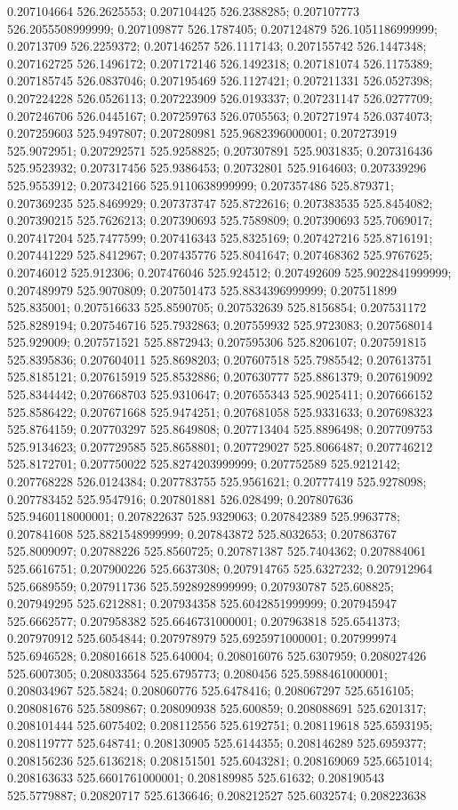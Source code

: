 0.207104664 526.2625553; 0.207104425 526.2388285; 0.207107773 526.2055508999999; 0.207109877 526.1787405; 0.207124879 526.1051186999999; 0.20713709 526.2259372; 0.207146257 526.1117143; 0.207155742 526.1447348; 0.207162725 526.1496172; 0.207172146 526.1492318; 0.207181074 526.1175389; 0.207185745 526.0837046; 0.207195469 526.1127421; 0.207211331 526.0527398; 0.207224228 526.0526113; 0.207223909 526.0193337; 0.207231147 526.0277709; 0.207246706 526.0445167; 0.207259763 526.0705563; 0.207271974 526.0374073; 0.207259603 525.9497807; 0.207280981 525.9682396000001; 0.207273919 525.9072951; 0.207292571 525.9258825; 0.207307891 525.9031835; 0.207316436 525.9523932; 0.207317456 525.9386453; 0.20732801 525.9164603; 0.207339296 525.9553912; 0.207342166 525.9110638999999; 0.207357486 525.879371; 0.207369235 525.8469929; 0.207373747 525.8722616; 0.207383535 525.8454082; 0.207390215 525.7626213; 0.207390693 525.7589809; 0.207390693 525.7069017; 0.207417204 525.7477599; 0.207416343 525.8325169; 0.207427216 525.8716191; 0.207441229 525.8412967; 0.207435776 525.8041647; 0.207468362 525.9767625; 0.20746012 525.912306; 0.207476046 525.924512; 0.207492609 525.9022841999999; 0.207489979 525.9070809; 0.207501473 525.8834396999999; 0.207511899 525.835001; 0.207516633 525.8590705; 0.207532639 525.8156854; 0.207531172 525.8289194; 0.207546716 525.7932863; 0.207559932 525.9723083; 0.207568014 525.929009; 0.207571521 525.8872943; 0.207595306 525.8206107; 0.207591815 525.8395836; 0.207604011 525.8698203; 0.207607518 525.7985542; 0.207613751 525.8185121; 0.207615919 525.8532886; 0.207630777 525.8861379; 0.207619092 525.8344442; 0.207668703 525.9310647; 0.207655343 525.9025411; 0.207666152 525.8586422; 0.207671668 525.9474251; 0.207681058 525.9331633; 0.207698323 525.8764159; 0.207703297 525.8649808; 0.207713404 525.8896498; 0.207709753 525.9134623; 0.207729585 525.8658801; 0.207729027 525.8066487; 0.207746212 525.8172701; 0.207750022 525.8274203999999; 0.207752589 525.9212142; 0.207768228 526.0124384; 0.207783755 525.9561621; 0.20777419 525.9278098; 0.207783452 525.9547916; 0.207801881 526.028499; 0.207807636 525.9460118000001; 0.207822637 525.9329063; 0.207842389 525.9963778; 0.207841608 525.8821548999999; 0.207843872 525.8032653; 0.207863767 525.8009097; 0.20788226 525.8560725; 0.207871387 525.7404362; 0.207884061 525.6616751; 0.207900226 525.6637308; 0.207914765 525.6327232; 0.207912964 525.6689559; 0.207911736 525.5928928999999; 0.207930787 525.608825; 0.207949295 525.6212881; 0.207934358 525.6042851999999; 0.207945947 525.6662577; 0.207958382 525.6646731000001; 0.207963818 525.6541373; 0.207970912 525.6054844; 0.207978979 525.6925971000001; 0.207999974 525.6946528; 0.208016618 525.640004; 0.208016076 525.6307959; 0.208027426 525.6007305; 0.208033564 525.6795773; 0.2080456 525.5988461000001; 0.208034967 525.5824; 0.208060776 525.6478416; 0.208067297 525.6516105; 0.208081676 525.5809867; 0.208090938 525.600859; 0.208088691 525.6201317; 0.208101444 525.6075402; 0.208112556 525.6192751; 0.208119618 525.6593195; 0.208119777 525.648741; 0.208130905 525.6144355; 0.208146289 525.6959377; 0.208156236 525.6136218; 0.208151501 525.6043281; 0.208169069 525.6651014; 0.208163633 525.6601761000001; 0.208189985 525.61632; 0.208190543 525.5779887; 0.20820717 525.6136646; 0.208212527 525.6032574; 0.208223638 